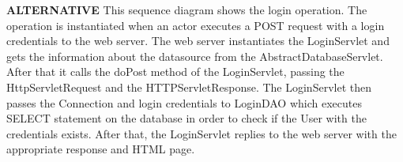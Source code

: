 \textbf{ALTERNATIVE}
This sequence diagram shows the login operation. The operation is instantiated when an actor executes a POST request with a login credentials to the web server. The web server instantiates the
LoginServlet and gets the information about the datasource from the AbstractDatabaseServlet.
After that it calls the doPost method of the LoginServlet, passing the HttpServletRequest and the HTTPServletResponse.
The LoginServlet then passes the Connection and login credentials to LoginDAO which executes SELECT statement on the database
in order to check if the User with the credentials exists. After that, the LoginServlet replies to the web server with the appropriate response and HTML page.
